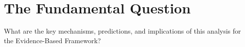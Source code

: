 \section{The Fundamental Question}
\label{sec:fundamental}

\begin{tcolorbox}[colback=red!5!white, colframe=red!75!black,
    title=The Fundamental Question]
What are the key mechanisms, predictions, and implications of this analysis
for the Evidence-Based Framework?
\end{tcolorbox}


